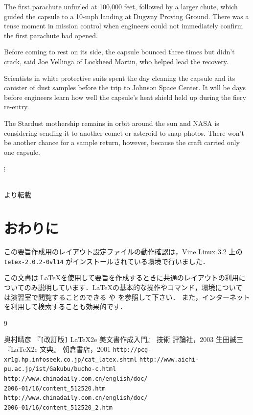 \documentclass[a4j,9pt,twocolumn,dvipdfmx]{jsarticle}
\begin{document}
The first parachute unfurled at 100,000 feet, followed by a larger
chute, which guided the capsule to a 10-mph landing at Dugway Proving
Ground. There was a tense moment in mission control when engineers could
not immediately confirm the first parachute had opened.

Before coming to rest on its side, the capsule bounced three times but
didn't crack, said Joe Vellinga of Lockheed Martin, who helped lead the
recovery.

Scientists in white protective suits spent the day cleaning the capsule
and its canister of dust samples before the trip to Johnson Space
Center. It will be days before engineers learn how well the capsule's
heat shield held up during the fiery re-entry.

The Stardust mothership remains in orbit around the sun and NASA is
considering sending it to another comet or asteroid to snap
photos. There won't be another chance for a sample return, however,
because the craft carried only one capsule.
\centerline{$\vdots$}\\[-0.5em]
\hfill{\cite{www2,www3} より転載}
\section{おわりに}
この要旨作成用のレイアウト設定ファイルの動作確認は，Vine Linux 3.2 上の
\texttt{tetex-2.0.2-0vl14} がインストールされている環境で行いました．

この文書は \LaTeX を使用して要旨を作成するときに共通のレイアウトの利用に
ついてのみ説明しています．\LaTeX の基本的な操作やコマンド，環境について
は演習室で閲覧することのできる \cite{美} や \cite{典} を参照して下さい．
また，インターネットを利用して検索することも効果的です．

\begin{thebibliography}{9}
\begin{small}
  奥村晴彦 『\verb#[#改訂版\verb#]# \LaTeX2e 美文書作成入門』 技術
       評論社，2003
  生田誠三 『\LaTeX2e 文典』 朝倉書店，2001
	 \texttt{http://pcg-xr1g.hp.infoseek.co.jp/cat\_latex.shtml}
	 \texttt{http://www.aichi-pu.ac.jp/ist/Gakubu/bucho-c.html}
	 \texttt{http://www.chinadaily.com.cn/english/doc/\\2006-01/16/content\_512520.htm}
	 \texttt{http://www.chinadaily.com.cn/english/doc/\\2006-01/16/content\_512520\_2.htm}
\end{small}
\end{thebibliography}
\end{document}
